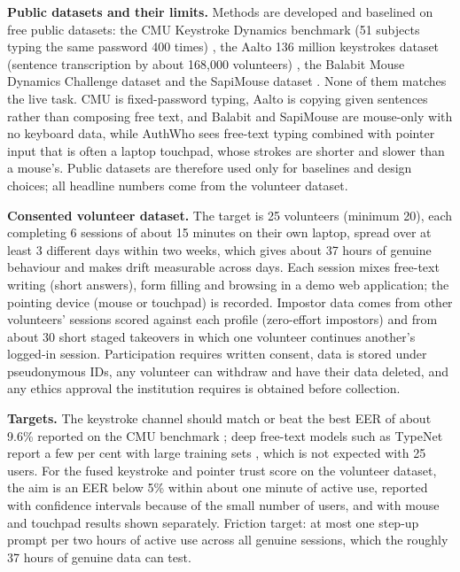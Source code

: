 \documentclass[10pt,letterpaper]{article}
\begin{document}
\vspace{4pt}
\textbf{Public datasets and their limits.} Methods are developed and baselined on free public datasets: the CMU Keystroke Dynamics benchmark (51 subjects typing the same password 400 times) \cite{killourhy2009}, the Aalto 136 million keystrokes dataset (sentence transcription by about 168,000 volunteers) \cite{dhakal2018}, the Balabit Mouse Dynamics Challenge dataset \cite{balabit2016} and the SapiMouse dataset \cite{antal2021}. None of them matches the live task. CMU is fixed-password typing, Aalto is copying given sentences rather than composing free text, and Balabit and SapiMouse are mouse-only with no keyboard data, while AuthWho sees free-text typing combined with pointer input that is often a laptop touchpad, whose strokes are shorter and slower than a mouse's. Public datasets are therefore used only for baselines and design choices; all headline numbers come from the volunteer dataset.

\textbf{Consented volunteer dataset.} The target is 25 volunteers (minimum 20), each completing 6 sessions of about 15 minutes on their own laptop, spread over at least 3 different days within two weeks, which gives about 37 hours of genuine behaviour and makes drift measurable across days. Each session mixes free-text writing (short answers), form filling and browsing in a demo web application; the pointing device (mouse or touchpad) is recorded. Impostor data comes from other volunteers' sessions scored against each profile (zero-effort impostors) and from about 30 short staged takeovers in which one volunteer continues another's logged-in session. Participation requires written consent, data is stored under pseudonymous IDs, any volunteer can withdraw and have their data deleted, and any ethics approval the institution requires is obtained before collection.

\textbf{Targets.} The keystroke channel should match or beat the best EER of about 9.6\% reported on the CMU benchmark \cite{killourhy2009}; deep free-text models such as TypeNet report a few per cent with large training sets \cite{acien2022}, which is not expected with 25 users. For the fused keystroke and pointer trust score on the volunteer dataset, the aim is an EER below 5\% within about one minute of active use, reported with confidence intervals because of the small number of users, and with mouse and touchpad results shown separately. Friction target: at most one step-up prompt per two hours of active use across all genuine sessions, which the roughly 37 hours of genuine data can test.
\end{document}
